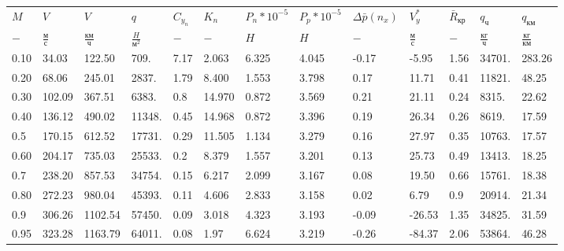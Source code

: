 \begin{tabular}{lllllllllllll}
$M$ & $V$ & $V$ & $q$ & $C_{y_n}$ & $K_n$ & $P_n*10^{-5}$ & $P_p*10^{-5}$ & $\Delta \bar{p}(n_x)$ & $V_y^*$ & $\bar{R}_{кр}$ & $q_{ч}$ & $q_{км}$ \\
$-$ & $\frac{м}{с}$ & $\frac{км}{ч}$ & $\frac{H}{м^2}$ & $-$ & $-$ & $H$ & $H$ & $-$ & $\frac{м}{с}$ & $-$ & $\frac{кг}{ч}$ & $\frac{кг}{км}$ \\
0.10 & 34.03 & 122.50 & 709. & 7.17 & 2.063 & 6.325 & 4.045 & -0.17 & -5.95 & 1.56 & 34701. & 283.26 \\
0.20 & 68.06 & 245.01 & 2837. & 1.79 & 8.400 & 1.553 & 3.798 & 0.17 & 11.71 & 0.41 & 11821. & 48.25 \\
0.30 & 102.09 & 367.51 & 6383. & 0.8 & 14.970 & 0.872 & 3.569 & 0.21 & 21.11 & 0.24 & 8315. & 22.62 \\
0.40 & 136.12 & 490.02 & 11348. & 0.45 & 14.968 & 0.872 & 3.396 & 0.19 & 26.34 & 0.26 & 8619. & 17.59 \\
0.5 & 170.15 & 612.52 & 17731. & 0.29 & 11.505 & 1.134 & 3.279 & 0.16 & 27.97 & 0.35 & 10763. & 17.57 \\
0.60 & 204.17 & 735.03 & 25533. & 0.2 & 8.379 & 1.557 & 3.201 & 0.13 & 25.73 & 0.49 & 13413. & 18.25 \\
0.7 & 238.20 & 857.53 & 34754. & 0.15 & 6.217 & 2.099 & 3.167 & 0.08 & 19.50 & 0.66 & 15761. & 18.38 \\
0.80 & 272.23 & 980.04 & 45393. & 0.11 & 4.606 & 2.833 & 3.158 & 0.02 & 6.79 & 0.9 & 20914. & 21.34 \\
0.9 & 306.26 & 1102.54 & 57450. & 0.09 & 3.018 & 4.323 & 3.193 & -0.09 & -26.53 & 1.35 & 34825. & 31.59 \\
0.95 & 323.28 & 1163.79 & 64011. & 0.08 & 1.97 & 6.624 & 3.219 & -0.26 & -84.37 & 2.06 & 53864. & 46.28 \\
\end{tabular}
